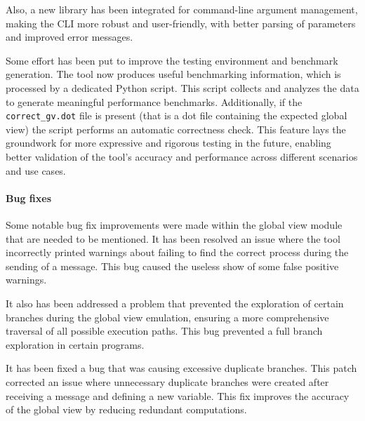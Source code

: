 Also, a new library has been integrated for command-line argument management,  
making the CLI more robust and user-friendly, with better parsing of  
parameters and improved error messages.

Some effort has been put to improve the testing environment and benchmark 
generation. The tool now produces useful benchmarking information, which is 
processed by a dedicated Python script. This script collects and analyzes the 
data to generate meaningful performance benchmarks. Additionally, if the  
\texttt{correct\_gv.dot} file is present (that is a dot file containing 
the expected global view) the script performs an automatic correctness check. 
This feature lays the groundwork for more expressive and rigorous testing in 
the future, enabling better validation of the tool's accuracy and performance
across different scenarios and use cases.

\paragraph{Bug fixes}
Some notable bug fix improvements were made within the global view module that 
are needed to be mentioned. It has been resolved an issue where the tool
incorrectly printed warnings about failing to find the correct process during
the sending of a message. This bug caused the useless show of some false 
positive warnings. 

It also has been addressed a problem that prevented the exploration of certain
branches during the global view emulation, ensuring a more comprehensive
traversal of all possible execution paths. This bug prevented a full branch
exploration in certain programs. 

It has been fixed a bug that was causing excessive duplicate branches. 
This patch corrected an issue where unnecessary duplicate branches were created  
after receiving a message and defining a new variable. This fix improves  
the accuracy of the global view by reducing redundant computations.  
